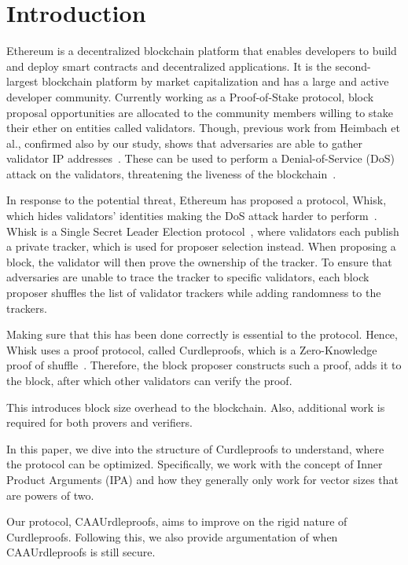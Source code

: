 

\section{Introduction}\label{sec:introduction}
Ethereum is a decentralized blockchain platform that enables developers to build and deploy smart contracts and decentralized applications.
It is the second-largest blockchain platform by market capitalization and has a large and active developer community.
Currently working as a Proof-of-Stake protocol, block proposal opportunities are allocated to the community members willing to stake their ether on entities called validators.
Though, previous work from Heimbach et al., confirmed also by our study, shows that adversaries are able to gather validator IP addresses~\cite{heimbach2024deanonymizingethereumvalidatorsp2p,ouroldpaper}.
These can be used to perform a Denial-of-Service (DoS) attack on the validators, threatening the liveness of the blockchain~\cite{EthereumAttackDefense2024,ouroldpaper}.

In response to the potential threat, Ethereum has proposed a protocol, Whisk, which hides validators' identities making the DoS attack harder to perform~\cite{Whisk2024}.
Whisk is a Single Secret Leader Election protocol~\cite{10.1145/3419614.3423258}, where validators each publish a private tracker, which is used for proposer selection instead.
When proposing a block, the validator will then prove the ownership of the tracker.
To ensure that adversaries are unable to trace the tracker to specific validators, each block proposer shuffles the list of validator trackers while adding randomness to the trackers.

Making sure that this has been done correctly is essential to the protocol.
Hence, Whisk uses a proof protocol, called Curdleproofs, which is a Zero-Knowledge proof of shuffle~\cite{Curdleproofs}.
Therefore, the block proposer constructs such a proof, adds it to the block, after which other validators can verify the proof.

This introduces block size overhead to the blockchain.
Also, additional work is required for both provers and verifiers.

In this paper, we dive into the structure of Curdleproofs to understand, where the protocol can be optimized.
Specifically, we work with the concept of Inner Product Arguments (IPA) and how they generally only work for vector sizes that are powers of two.

Our protocol, CAAUrdleproofs, aims to improve on the rigid nature of Curdleproofs.
Following this, we also provide argumentation of when CAAUrdleproofs is still secure.


